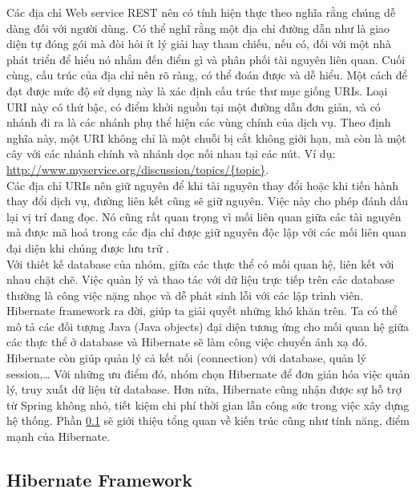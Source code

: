 \documentclass[12pt,a4paper,oneside]{extbook}
\begin{document}
Các địa chỉ Web service REST nên có tính hiện thực theo nghĩa rằng chúng dễ dàng đối với người dùng. Có thể nghĩ rằng một địa chỉ đường dẫn như là giao diện tự đóng gói mà đòi hỏi ít lý giải hay tham chiếu, nếu có, đối với một nhà phát triển để hiểu nó nhắm đến điểm gì và phân phối tài nguyên liên quan. Cuối cùng, cấu trúc của địa chỉ nên rõ ràng, có thể đoán được và dễ hiểu.
Một cách để đạt được mức độ sử dụng này là xác định cấu trúc thư mục giống URIs. Loại URI này có thứ bậc, có điểm khởi nguồn tại một đường dẫn đơn giản, và có nhánh đi ra là các nhánh phụ thể hiện các vùng chính của dịch vụ. Theo định nghĩa này, một URI không chỉ là một chuỗi bị cắt không giới hạn, mà còn là một cây với các nhánh chính và nhánh dọc nối nhau tại các nút. Ví dụ: \url{http://www.myservice.org/discussion/topics/{topic}}.\\

\noindent
Các địa chỉ URIs nên giữ nguyên để khi tài nguyên thay đổi hoặc khi tiến hành thay đổi dịch vụ, đường liên kết cũng sẽ giữ nguyên. Việc này cho phép đánh dấu lại vị trí đang đọc. Nó cũng rất quan trọng vì mối liên quan giữa các tài nguyên mà được mã hoá trong các địa chỉ được giữ nguyên độc lập với các mối liên quan đại diện khi chúng được lưu trữ \cite{restful-basic}.\\

\noindent
Với thiết kế database của nhóm, giữa các thực thể có mối quan hệ, liên kết với nhau chặt chẽ. Việc quản lý và thao tác với dữ liệu trực tiếp trên các database thường là công việc nặng nhọc và dễ phát sinh lỗi với các lập trình viên. Hibernate framework ra đời, giúp ta giải quyết những khó khăn trên. Ta có thể mô tả các đối tượng Java (Java objects) đại diện tương ứng cho mối quan hệ giữa các thực thể ở database và Hibernate sẽ làm công việc chuyển ánh xạ đó. Hibernate còn giúp quản lý cả kết nối (connection) với database, quản lý session,\dots\hspace{0mm} Với những ưu điểm đó, nhóm chọn Hibernate để đơn giản hóa việc quản lý, truy xuất dữ liệu từ database. Hơn nữa, Hibernate cũng nhận được sự hỗ trợ từ Spring không nhỏ, tiết kiệm chi phí thời gian lẫn công sức trong việc xây dựng hệ thống. Phần \ref{hibernate} sẽ giới thiệu tổng quan về kiến trúc cũng như tính năng, điểm mạnh của Hibernate.

\subsection{Hibernate Framework}\label{hibernate}
\end{document}

